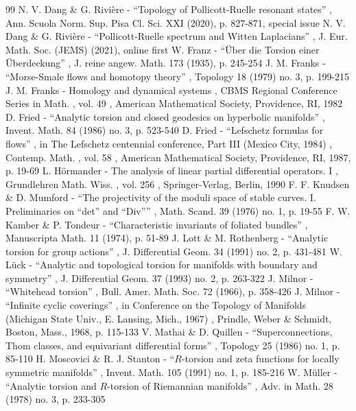 \documentclass[11pt]{article}
\numberwithin{equation}{section}
\begin{document}
\begin{thebibliography}{99}
 N. V. Dang \& G. Rivière - “Topology of Pollicott-Ruelle resonant states” , Ann. Scuola Norm. Sup. Pisa Cl. Sci. XXI (2020), p. 827-871, special issue
 N. V. Dang \& G. Rivière - “Pollicott-Ruelle spectrum and Witten Laplacians” , J. Eur. Math. Soc. (JEMS) (2021), online first
 W. Franz - “Über die Torsion einer Überdeckung” , J. reine angew. Math. 173 (1935), p. 245-254
 J. M. Franks - “Morse-Smale flows and homotopy theory” , Topology 18 (1979) no. 3, p. 199-215
 J. M. Franks - Homology and dynamical systems , CBMS Regional Conference Series in Math. , vol. 49 , American Mathematical Society, Providence, RI, 1982
 D. Fried - “Analytic torsion and closed geodesics on hyperbolic manifolds” , Invent. Math. 84 (1986) no. 3, p. 523-540
 D. Fried - “Lefschetz formulas for flows” , in The Lefschetz centennial conference, Part III (Mexico City, 1984) , Contemp. Math. , vol. 58 , American Mathematical Society, Providence, RI, 1987, p. 19-69
 L. Hörmander - The analysis of linear partial differential operators. I , Grundlehren Math. Wiss. , vol. 256 , Springer-Verlag, Berlin, 1990
 F. F. Knudsen \& D. Mumford - “The projectivity of the moduli space of stable curves. I. Preliminaries on “det” and “Div”” , Math. Scand. 39 (1976) no. 1, p. 19-55
 F. W. Kamber \& P. Tondeur - “Characteristic invariants of foliated bundles” , Manuscripta Math. 11 (1974), p. 51-89
 J. Lott \& M. Rothenberg - “Analytic torsion for group actions” , J. Differential Geom. 34 (1991) no. 2, p. 431-481
 W. Lück - “Analytic and topological torsion for manifolds with boundary and symmetry” , J. Differential Geom. 37 (1993) no. 2, p. 263-322
 J. Milnor - “Whitehead torsion” , Bull. Amer. Math. Soc. 72 (1966), p. 358-426
 J. Milnor - “Infinite cyclic coverings” , in Conference on the Topology of Manifolds (Michigan State Univ., E. Lansing, Mich., 1967) , Prindle, Weber \& Schmidt, Boston, Mass., 1968, p. 115-133
 V. Mathai \& D. Quillen - “Superconnections, Thom classes, and equivariant differential forms” , Topology 25 (1986) no. 1, p. 85-110
 H. Moscovici \& R. J. Stanton - “$R$-torsion and zeta functions for locally symmetric manifolds” , Invent. Math. 105 (1991) no. 1, p. 185-216
 W. Müller - “Analytic torsion and $R$-torsion of Riemannian manifolds” , Adv. in Math. 28 (1978) no. 3, p. 233-305

\end{thebibliography}
\end{document}
